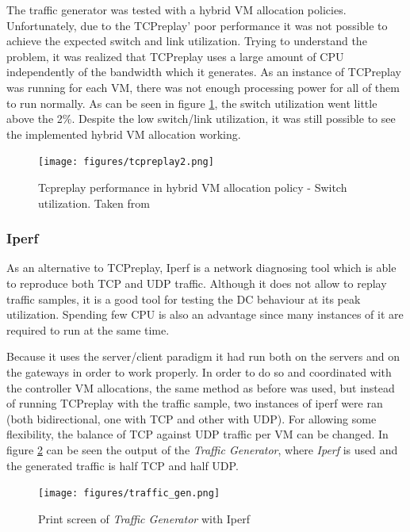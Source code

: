 \documentclass[12pt,english,oneside]{book}
\begin{document}
The traffic generator was tested with a hybrid VM allocation policies.
Unfortunately, due to the TCPreplay' poor performance it was not possible to achieve the expected switch and link utilization.
Trying to understand the problem, it was realized that TCPreplay uses a large amount of CPU independently of the bandwidth which it generates. As an instance of TCPreplay was running for each VM, there was not enough processing power for all of them to run normally.
As can be seen in figure \ref{fig:tcpreplay}, the switch utilization went little above the 2\%.
Despite the low switch/link utilization, it was still possible to see the implemented hybrid VM allocation working.

\begin{figure}[h!tbp]
        \centering
        \texttt{[image: figures/tcpreplay2.png]}
        \caption{Tcpreplay performance in hybrid VM allocation policy - Switch utilization. Taken from \cite{im2013}}
        \label{fig:tcpreplay}
\end{figure}

\subsubsection{Iperf}
\hspace{0.6cm}

As an alternative to TCPreplay, Iperf\cite{iperf} is a network diagnosing tool which is able to reproduce both TCP and UDP traffic.
Although it does not allow to replay traffic samples, it is a good tool for testing the DC behaviour at its peak utilization.
Spending few CPU is also an advantage since many instances of it are required to run at the same time.

Because it uses the server/client paradigm it had run both on the servers and on the gateways in order to work properly. In order to do so and coordinated with the controller VM allocations, the same method as before was used, but instead of running TCPreplay with the traffic sample, two instances of iperf were ran (both bidirectional, one with TCP and other with UDP). For allowing some flexibility, the balance of TCP against UDP traffic per VM can be changed. In figure \ref{fig:trafficgen} can be seen the output of the \textit{Traffic Generator}, where \textit{Iperf} is used and the generated traffic is half TCP and half UDP.

\begin{figure}[h!tbp]
        \centering
        \texttt{[image: figures/traffic\_gen.png]}
        \caption{Print screen of \textit{Traffic Generator} with Iperf}
        \label{fig:trafficgen}
\end{figure}
\end{document}
